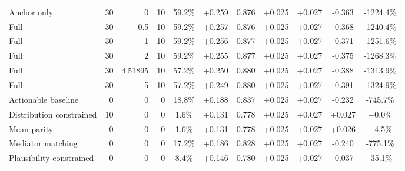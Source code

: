 \begin{table}[htbp]
\begin{tabular}{lrrrccccccc}
Anchor only & 30 & 0 & 10 & 59.2\% & +0.259 & 0.876 & +0.025 & +0.027 & -0.363 & -1224.4\% \\
Full & 30 & 0.5 & 10 & 59.2\% & +0.257 & 0.876 & +0.025 & +0.027 & -0.368 & -1240.4\% \\
Full & 30 & 1 & 10 & 59.2\% & +0.256 & 0.877 & +0.025 & +0.027 & -0.371 & -1251.6\% \\
Full & 30 & 2 & 10 & 59.2\% & +0.255 & 0.877 & +0.025 & +0.027 & -0.375 & -1268.3\% \\
Full & 30 & 4.51895 & 10 & 57.2\% & +0.250 & 0.880 & +0.025 & +0.027 & -0.388 & -1313.9\% \\
Full & 30 & 5 & 10 & 57.2\% & +0.249 & 0.880 & +0.025 & +0.027 & -0.391 & -1324.9\% \\
Actionable baseline & 0 & 0 & 0 & 18.8\% & +0.188 & 0.837 & +0.025 & +0.027 & -0.232 & -745.7\% \\
Distribution constrained & 10 & 0 & 0 & 1.6\% & +0.131 & 0.778 & +0.025 & +0.027 & +0.027 & +0.0\% \\
Mean parity & 0 & 0 & 0 & 1.6\% & +0.131 & 0.778 & +0.025 & +0.027 & +0.026 & +4.5\% \\
Mediator matching & 0 & 0 & 0 & 17.2\% & +0.186 & 0.828 & +0.025 & +0.027 & -0.240 & -775.1\% \\
Plausibility constrained & 0 & 0 & 0 & 8.4\% & +0.146 & 0.780 & +0.025 & +0.027 & -0.037 & -35.1\% \\
\bottomrule
\end{tabular}
\end{table}